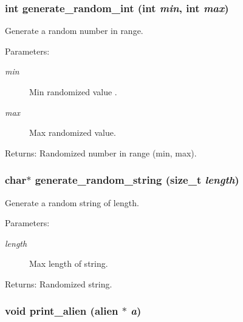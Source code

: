 \subsubsection{\setlength{\rightskip}{0pt plus 5cm}int generate\_\-random\_\-int (int {\em min}, int {\em max})}\label{struct_8c_d648b1aad3b03e6e8ac8db8197efd343}


Generate a random number in range. 

\begin{Desc}
\item[Parameters:]
\begin{description}
\item[{\em min}]Min randomized value . \item[{\em max}]Max randomized value. \end{description}
\end{Desc}
\begin{Desc}
\item[Returns:]Randomized number in range (min, max). \end{Desc}
\subsubsection{\setlength{\rightskip}{0pt plus 5cm}char$\ast$ generate\_\-random\_\-string (size\_\-t {\em length})}\label{struct_8c_ae29e50030db5b7eec24f334e5fb5d44}


Generate a random string of length. 

\begin{Desc}
\item[Parameters:]
\begin{description}
\item[{\em length}]Max length of string. \end{description}
\end{Desc}
\begin{Desc}
\item[Returns:]Randomized string. \end{Desc}
\subsubsection{\setlength{\rightskip}{0pt plus 5cm}void print\_\-alien (\bf{alien} $\ast$ {\em a})}\label{struct_8c_3f1573acf08e9e31f221854df791ab06}


